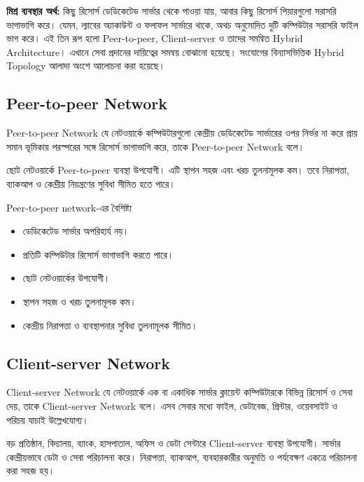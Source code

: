 \textbf{মিশ্র ব্যবস্থার অর্থ:} কিছু রিসোর্স ডেডিকেটেড সার্ভার থেকে পাওয়া যায়, আবার কিছু রিসোর্স পিয়ারগুলো সরাসরি ভাগাভাগি করে। যেমন, ল্যাবের অ্যাকাউন্ট ও ফলাফল সার্ভারে থাকে, অথচ অনুমোদিত দুটি কম্পিউটার সরাসরি ফাইল ভাগ করে। এই তিন রূপ হলো Peer-to-peer, Client-server ও তাদের সমন্বিত Hybrid Architecture। এখানে সেবা প্রদানের দায়িত্বের সমন্বয় বোঝানো হয়েছে। সংযোগের বিন্যাসভিত্তিক Hybrid Topology আলাদা অংশে আলোচনা করা হয়েছে।

\subsection{Peer-to-peer Network}

\begin{definitionbox}{Peer-to-peer Network}
যে নেটওয়ার্কে কম্পিউটারগুলো কেন্দ্রীয় ডেডিকেটেড সার্ভারের ওপর নির্ভর না করে প্রায় সমান ভূমিকায় পরস্পরের সঙ্গে রিসোর্স ভাগাভাগি করে, তাকে Peer-to-peer Network বলে।
\end{definitionbox}

ছোট নেটওয়ার্কে Peer-to-peer ব্যবস্থা উপযোগী। এটি স্থাপন সহজ এবং খরচ তুলনামূলক কম। তবে নিরাপত্তা, ব্যাকআপ ও কেন্দ্রীয় নিয়ন্ত্রণের সুবিধা সীমিত হতে পারে।

\begin{keypointbox}{Peer-to-peer network-এর বৈশিষ্ট্য}
\begin{itemize}
\item ডেডিকেটেড সার্ভার অপরিহার্য নয়।
\item প্রতিটি কম্পিউটার রিসোর্স ভাগাভাগি করতে পারে।
\item ছোট নেটওয়ার্কের উপযোগী।
\item স্থাপন সহজ ও খরচ তুলনামূলক কম।
\item কেন্দ্রীয় নিরাপত্তা ও ব্যবস্থাপনার সুবিধা তুলনামূলক সীমিত।
\end{itemize}
\end{keypointbox}

\subsection{Client-server Network}

\begin{definitionbox}{Client-server Network}
যে নেটওয়ার্কে এক বা একাধিক সার্ভার ক্লায়েন্ট কম্পিউটারকে বিভিন্ন রিসোর্স ও সেবা দেয়, তাকে Client-server Network বলে। এসব সেবার মধ্যে ফাইল, ডেটাবেজ, প্রিন্টার, ওয়েবসাইট ও পরিচয় যাচাই উল্লেখযোগ্য।
\end{definitionbox}

বড় প্রতিষ্ঠান, বিদ্যালয়, ব্যাংক, হাসপাতাল, অফিস ও ডেটা সেন্টারে Client-server ব্যবস্থা উপযোগী। সার্ভার কেন্দ্রীয়ভাবে ডেটা ও সেবা পরিচালনা করে। নিরাপত্তা, ব্যাকআপ, ব্যবহারকারীর অনুমতি ও পর্যবেক্ষণ একত্রে পরিচালনা করা সহজ হয়।

